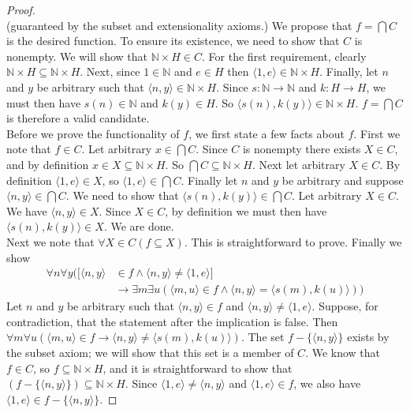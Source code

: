 \documentclass{report}
\begin{document}
\begin{proof}
\begin{equation*}
\end{equation*}
(guaranteed by the subset and extensionality axioms.) We propose that $f=\bigcap C$ is the desired function. To ensure its existence, we need to show that $C$ is nonempty.
We will show that $\mathbb N\times H\in C$. For the first requirement, clearly $\mathbb N\times H\subseteq\mathbb N\times H$.
Next, since $1\in\mathbb N$ and $e\in H$ then $\langle 1,e\rangle\in\mathbb N\times H$. Finally, let $n$ and $y$ be arbitrary such that $\langle n,y\rangle\in\mathbb N\times H$. 
Since $s:\mathbb N\to\mathbb N$ and $k:H\to H$, we must then have $s(n)\in\mathbb N$ and $k(y)\in H$. So $\langle s(n),k(y)\rangle\in\mathbb N\times H$. $f=\bigcap C$ is therefore a valid candidate.\\
\indent Before we prove the functionality of $f$, we first state a few facts about $f$.
First we note that $f\in C$. Let arbitrary $x\in\bigcap C$. Since $C$ is nonempty there exists $X\in C$, and by definition $x\in X\subseteq\mathbb N\times H$. So 
$\bigcap C\subseteq\mathbb N\times H$. Next let arbitrary $X\in C$. By definition $\langle 1,e\rangle\in X$, so $\langle 1,e\rangle\in\bigcap C$. Finally let $n$ and $y$ be arbitrary and suppose 
$\langle n,y\rangle\in\bigcap C$. We need to show that $\langle s(n),k(y)\rangle\in\bigcap C$. 
Let arbitrary $X\in C$. We have $\langle n,y\rangle\in X$. Since $X\in C$, by definition we must then have $\langle s(n),k(y)\rangle\in X$. We are done.\\
\indent Next we note that $\forall X\in C(f\subseteq X)$. This is straightforward to prove.
Finally we show
\begin{align*}
\forall n\forall y([\langle n,y\rangle&\in f\land\langle n,y\rangle\neq\langle 1,e\rangle]\\&\to
\exists m\exists u(\langle m,u\rangle\in f\land\langle n,y\rangle=\langle s(m),k(u)\rangle))
\end{align*}
Let $n$ and $y$ be arbitrary such that $\langle n,y\rangle\in f$ and $\langle n,y\rangle\neq\langle1,e\rangle$. Suppose, for contradiction, that the statement after the implication is false.
Then $\forall m\forall u(\langle m,u\rangle\in f\to \langle n,y\rangle\neq\langle s(m),k(u)\rangle)$. The set $f-\{\langle n,y\rangle\}$ exists by the subset axiom; we will show that this set is a
member of $C$. We know that $f\in C$, so $f\subseteq\mathbb N\times H$, and it is straightforward to show that $(f-\{\langle n,y\rangle\})\subseteq\mathbb N\times H$. 
Since $\langle 1,e\rangle\neq\langle n,y\rangle$ and $\langle 1,e\rangle\in f$, we also have $\langle 1,e\rangle\in f-\{\langle n,y\rangle\}$. 

\end{proof}
\end{document}
